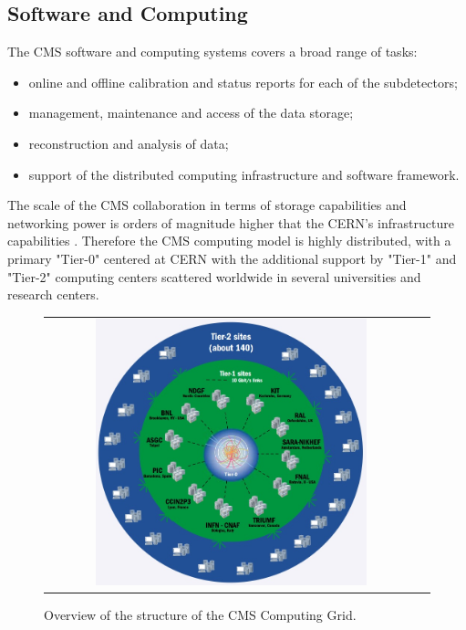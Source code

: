 \clearpage

\subsection{Software and Computing}

The CMS software and computing systems covers a broad range of tasks:

\begin{itemize}
	\item online and offline calibration and status reports for each of the subdetectors;
	\item management, maintenance and access of the data storage;
	\item reconstruction and analysis of data;
	\item support of the distributed computing infrastructure and software framework.
\end{itemize}

The scale of the CMS collaboration in terms of storage capabilities and networking power is orders of magnitude higher that the CERN's infrastructure capabilities \cite{CMS:2005aa}. Therefore the CMS computing model is highly distributed, with a primary "Tier-0" centered at CERN with the additional support by "Tier-1" and "Tier-2" computing centers scattered worldwide in several universities and research centers. 

\begin{figure}[tbh!]
	\centering
	\begin{tabular}{cc}
		\includegraphics[width=0.75\textwidth]{detector/pics/CMS_grid.jpg}
	\end{tabular}
	\caption{Overview of the structure of the CMS Computing Grid.}
	\label{fig:CMS_grid}
\end{figure}

